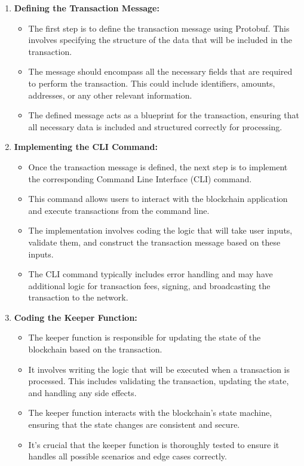 \begin{enumerate}
    \item \textbf{Defining the Transaction Message:}
    \begin{itemize}
        \item The first step is to define the transaction message using Protobuf. This involves specifying the structure of the data that will be included in the transaction. 
        \item The message should encompass all the necessary fields that are required to perform the transaction. This could include identifiers, amounts, addresses, or any other relevant information.
        \item The defined message acts as a blueprint for the transaction, ensuring that all necessary data is included and structured correctly for processing.
    \end{itemize}

    \item \textbf{Implementing the CLI Command:}
    \begin{itemize}
        \item Once the transaction message is defined, the next step is to implement the corresponding Command Line Interface (CLI) command.
        \item This command allows users to interact with the blockchain application and execute transactions from the command line.
        \item The implementation involves coding the logic that will take user inputs, validate them, and construct the transaction message based on these inputs.
        \item The CLI command typically includes error handling and may have additional logic for transaction fees, signing, and broadcasting the transaction to the network.
    \end{itemize}

    \item \textbf{Coding the Keeper Function:}
    \begin{itemize}
        \item The keeper function is responsible for updating the state of the blockchain based on the transaction.
        \item It involves writing the logic that will be executed when a transaction is processed. This includes validating the transaction, updating the state, and handling any side effects.
        \item The keeper function interacts with the blockchain's state machine, ensuring that the state changes are consistent and secure.
        \item It's crucial that the keeper function is thoroughly tested to ensure it handles all possible scenarios and edge cases correctly.
    \end{itemize}
\end{enumerate}

